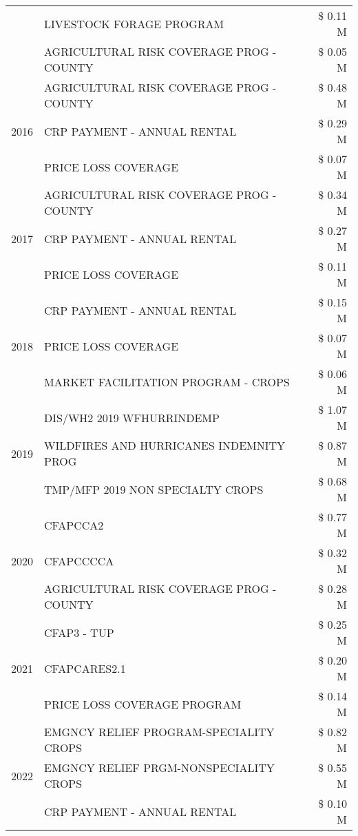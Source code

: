 \begin{tabular}{llr}
 & LIVESTOCK FORAGE PROGRAM & \$ 0.11 M \\
 & AGRICULTURAL RISK COVERAGE PROG - COUNTY & \$ 0.05 M \\
\cline{1-3}
\multirow[t]{3}{*}{2016} & AGRICULTURAL RISK COVERAGE PROG - COUNTY & \$ 0.48 M \\
 & CRP PAYMENT - ANNUAL RENTAL & \$ 0.29 M \\
 & PRICE LOSS COVERAGE & \$ 0.07 M \\
\cline{1-3}
\multirow[t]{3}{*}{2017} & AGRICULTURAL RISK COVERAGE PROG - COUNTY & \$ 0.34 M \\
 & CRP PAYMENT - ANNUAL RENTAL & \$ 0.27 M \\
 & PRICE LOSS COVERAGE & \$ 0.11 M \\
\cline{1-3}
\multirow[t]{3}{*}{2018} & CRP PAYMENT - ANNUAL RENTAL & \$ 0.15 M \\
 & PRICE LOSS COVERAGE & \$ 0.07 M \\
 & MARKET FACILITATION PROGRAM - CROPS & \$ 0.06 M \\
\cline{1-3}
\multirow[t]{3}{*}{2019} & DIS/WH2 2019 WFHURRINDEMP & \$ 1.07 M \\
 & WILDFIRES AND HURRICANES INDEMNITY PROG & \$ 0.87 M \\
 & TMP/MFP 2019 NON SPECIALTY CROPS & \$ 0.68 M \\
\cline{1-3}
\multirow[t]{3}{*}{2020} & CFAPCCA2 & \$ 0.77 M \\
 & CFAPCCCCA & \$ 0.32 M \\
 & AGRICULTURAL RISK COVERAGE PROG - COUNTY & \$ 0.28 M \\
\cline{1-3}
\multirow[t]{3}{*}{2021} & CFAP3 - TUP & \$ 0.25 M \\
 & CFAPCARES2.1 & \$ 0.20 M \\
 & PRICE LOSS COVERAGE PROGRAM & \$ 0.14 M \\
\cline{1-3}
\multirow[t]{3}{*}{2022} & EMGNCY RELIEF PROGRAM-SPECIALITY CROPS & \$ 0.82 M \\
 & EMGNCY RELIEF PRGM-NONSPECIALITY CROPS & \$ 0.55 M \\
 & CRP PAYMENT - ANNUAL RENTAL & \$ 0.10 M \\
\cline{1-3}
\bottomrule
\end{tabular}
